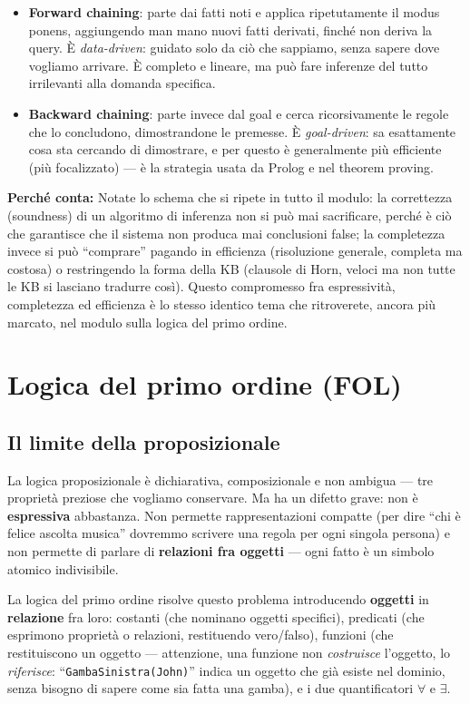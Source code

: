\documentclass[11pt,a4paper]{article}
\newcommand{\perche}[1]{\begin{nota}\textbf{Perché conta:} #1\end{nota}}
\begin{document}
\begin{itemize}
  \item \textbf{Forward chaining}: parte dai fatti noti e applica ripetutamente il modus ponens, aggiungendo man mano nuovi fatti derivati, finché non deriva la query. È \emph{data-driven}: guidato solo da ciò che sappiamo, senza sapere dove vogliamo arrivare. È completo e lineare, ma può fare inferenze del tutto irrilevanti alla domanda specifica.
  \item \textbf{Backward chaining}: parte invece dal goal e cerca ricorsivamente le regole che lo concludono, dimostrandone le premesse. È \emph{goal-driven}: sa esattamente cosa sta cercando di dimostrare, e per questo è generalmente più efficiente (più focalizzato) --- è la strategia usata da Prolog e nel theorem proving.
\end{itemize}

\perche{Notate lo schema che si ripete in tutto il modulo: la correttezza (soundness) di un algoritmo di inferenza non si può mai sacrificare, perché è ciò che garantisce che il sistema non produca mai conclusioni false; la completezza invece si può ``comprare'' pagando in efficienza (risoluzione generale, completa ma costosa) o restringendo la forma della KB (clausole di Horn, veloci ma non tutte le KB si lasciano tradurre così). Questo compromesso fra espressività, completezza ed efficienza è lo stesso identico tema che ritroverete, ancora più marcato, nel modulo sulla logica del primo ordine.}

\newpage
\section{Logica del primo ordine (FOL)}

\subsection{Il limite della proposizionale}

La logica proposizionale è dichiarativa, composizionale e non ambigua --- tre proprietà preziose che vogliamo conservare. Ma ha un difetto grave: non è \textbf{espressiva} abbastanza. Non permette rappresentazioni compatte (per dire ``chi è felice ascolta musica'' dovremmo scrivere una regola per ogni singola persona) e non permette di parlare di \textbf{relazioni fra oggetti} --- ogni fatto è un simbolo atomico indivisibile.

La logica del primo ordine risolve questo problema introducendo \textbf{oggetti} in \textbf{relazione} fra loro: costanti (che nominano oggetti specifici), predicati (che esprimono proprietà o relazioni, restituendo vero/falso), funzioni (che restituiscono un oggetto --- attenzione, una funzione non \emph{costruisce} l'oggetto, lo \emph{riferisce}: ``\texttt{GambaSinistra(John)}'' indica un oggetto che già esiste nel dominio, senza bisogno di sapere come sia fatta una gamba), e i due quantificatori $\forall$ e $\exists$.
\end{document}
